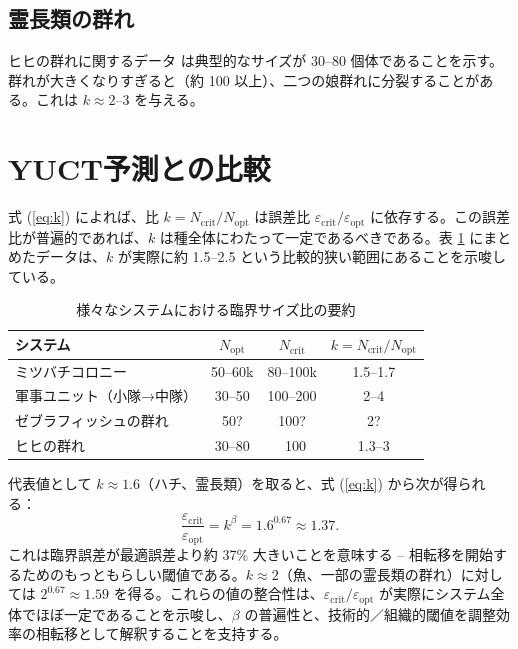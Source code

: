 \documentclass[12pt]{article}
\theoremstyle{remark}
\begin{document}
	\subsection{霊長類の群れ}
	\label{subsec:primates}
	
	ヒヒの群れに関するデータ \cite{Alberts1995} は典型的なサイズが 30–80 個体であることを示す。群れが大きくなりすぎると（約 100 以上）、二つの娘群れに分裂することがある。これは \(k \approx 2\)–\(3\) を与える。
	
	\section{YUCT予測との比較}
	\label{sec:comparison}
	
	式 (\ref{eq:k}) によれば、比 \(k = N_{\text{crit}}/N_{\text{opt}}\) は誤差比 \(\varepsilon_{\text{crit}}/\varepsilon_{\text{opt}}\) に依存する。この誤差比が普遍的であれば、\(k\) は種全体にわたって一定であるべきである。表 \ref{tab:summary} にまとめたデータは、\(k\) が実際に約 1.5–2.5 という比較的狭い範囲にあることを示唆している。
	
	\begin{table}[htbp]
		\centering
		\caption{様々なシステムにおける臨界サイズ比の要約}
		\label{tab:summary}
		\begin{tabular}{lccc}
			\toprule
			\textbf{システム} & \(N_{\text{opt}}\) & \(N_{\text{crit}}\) & \(k = N_{\text{crit}}/N_{\text{opt}}\) \\
			\midrule
			ミツバチコロニー & 50–60k & 80–100k & 1.5–1.7 \\
			軍事ユニット（小隊→中隊） & 30–50 & 100–200 & 2–4 \\
			ゼブラフィッシュの群れ & 50? & 100? & 2? \\
			ヒヒの群れ & 30–80 & ~100 & 1.3–3 \\
			\bottomrule
		\end{tabular}
	\end{table}
	
	代表値として \(k \approx 1.6\)（ハチ、霊長類）を取ると、式 (\ref{eq:k}) から次が得られる：
	\[
	\frac{\varepsilon_{\text{crit}}}{\varepsilon_{\text{opt}}} = k^{\beta} = 1.6^{0.67} \approx 1.37.
	\]
	これは臨界誤差が最適誤差より約 37\% 大きいことを意味する – 相転移を開始するためのもっともらしい閾値である。\(k \approx 2\)（魚、一部の霊長類の群れ）に対しては \(2^{0.67} \approx 1.59\) を得る。これらの値の整合性は、\(\varepsilon_{\text{crit}}/\varepsilon_{\text{opt}}\) が実際にシステム全体でほぼ一定であることを示唆し、\(\beta\) の普遍性と、技術的／組織的閾値を調整効率の相転移として解釈することを支持する。
	
\end{document}
